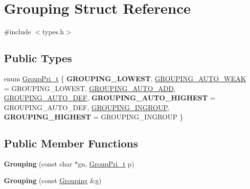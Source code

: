 \hypertarget{struct_grouping}{}\section{Grouping Struct Reference}
\label{struct_grouping}


{\ttfamily \#include $<$types.\+h$>$}

\subsection*{Public Types}
\begin{DoxyCompactItemize}
\item 
enum \mbox{\hyperlink{struct_grouping_a9f0ec5ab376b083ebe3274ea79fd2d70}{Group\+Pri\+\_\+t}} \{ \newline
{\bfseries G\+R\+O\+U\+P\+I\+N\+G\+\_\+\+L\+O\+W\+E\+ST}, 
\mbox{\hyperlink{struct_grouping_a9f0ec5ab376b083ebe3274ea79fd2d70aa59227c8fa39faf56ebc4c06e08d4d84}{G\+R\+O\+U\+P\+I\+N\+G\+\_\+\+A\+U\+T\+O\+\_\+\+W\+E\+AK}} = G\+R\+O\+U\+P\+I\+N\+G\+\_\+\+L\+O\+W\+E\+ST, 
\mbox{\hyperlink{struct_grouping_a9f0ec5ab376b083ebe3274ea79fd2d70a44f89332beea02ebc5d56bcb71a081ba}{G\+R\+O\+U\+P\+I\+N\+G\+\_\+\+A\+U\+T\+O\+\_\+\+A\+DD}}, 
\mbox{\hyperlink{struct_grouping_a9f0ec5ab376b083ebe3274ea79fd2d70ab767fc9fe6f874c09362fd1350738f7f}{G\+R\+O\+U\+P\+I\+N\+G\+\_\+\+A\+U\+T\+O\+\_\+\+D\+EF}}, 
\newline
{\bfseries G\+R\+O\+U\+P\+I\+N\+G\+\_\+\+A\+U\+T\+O\+\_\+\+H\+I\+G\+H\+E\+ST} = G\+R\+O\+U\+P\+I\+N\+G\+\_\+\+A\+U\+T\+O\+\_\+\+D\+EF, 
\mbox{\hyperlink{struct_grouping_a9f0ec5ab376b083ebe3274ea79fd2d70a464b2001acf04bed5df29c11a66fb2fb}{G\+R\+O\+U\+P\+I\+N\+G\+\_\+\+I\+N\+G\+R\+O\+UP}}, 
{\bfseries G\+R\+O\+U\+P\+I\+N\+G\+\_\+\+H\+I\+G\+H\+E\+ST} = G\+R\+O\+U\+P\+I\+N\+G\+\_\+\+I\+N\+G\+R\+O\+UP
 \}
\end{DoxyCompactItemize}
\subsection*{Public Member Functions}
\begin{DoxyCompactItemize}
\item 
\mbox{\label{struct_grouping_a41b9c9ed04b5fa49a91a6e18e84d3576}} 
{\bfseries Grouping} (const char $\ast$gn, \mbox{\hyperlink{struct_grouping_a9f0ec5ab376b083ebe3274ea79fd2d70}{Group\+Pri\+\_\+t}} p)
\item 
\mbox{\label{struct_grouping_ab8595b4b30745ff7b201e023b486ab67}} 
{\bfseries Grouping} (const \mbox{\hyperlink{struct_grouping}{Grouping}} \&g)
\end{DoxyCompactItemize}
